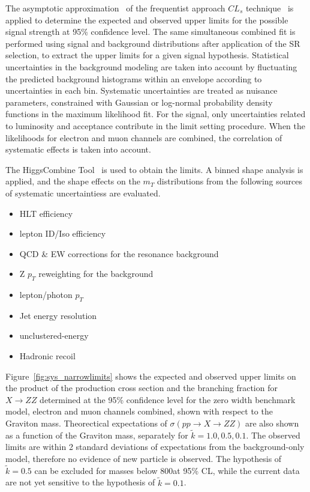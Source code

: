\vspace{0.3cm}
The asymptotic approximation~\cite{sys_cls0} of the frequentist approach $CL_s$ technique~\cite{sys_cls1,sys_cls2,sys_cls3} is applied to determine the expected and observed upper limits for the possible signal strength at 95\% confidence level. The same simultaneous combined fit is performed using signal and background distributions after application of the SR selection, to extract the upper limits for a given signal hypothesis. Statistical uncertainties in the background modeling are taken into account by fluctuating the predicted background histograms within an envelope according to uncertainties in each bin. Systematic uncertainties are treated as nuisance parameters, constrained with Gaussian or log-normal probability density functions in the maximum likelihood fit. For the signal, only uncertainties related to luminosity and acceptance contribute in the limit setting procedure. When the likelihoods for electron and muon channels are combined, the correlation of systematic effects is taken into account. 

\vspace{0.3cm}
The HiggsCombine Tool~\cite{sys_higgscombinetool} is used to obtain the limits. A binned shape analysis is applied, and the shape effects on the $m_T$ distributions from the following sources of systematic uncertaintiess are evaluated.
\begin{itemize}
\item HLT efficiency
\item lepton ID/Iso efficiency
\item QCD \& EW corrections for the resonance background
\item Z $p_T$ reweighting for the \Zjets background
\item \ptmiss lepton/photon $p_T$
\item \ptmiss Jet energy resolution
\item \ptmiss unclustered-energy
\item \ptmiss Hadronic recoil 
\end{itemize}

\vspace{0.3cm}
Figure~\ref{fig:sys_narrowlimits} shows the expected and observed upper limits on the product of the production cross section and the branching fraction for $X\rightarrow ZZ$ determined at the 95\% confidence level for the zero width benchmark model, electron and muon channels combined, shown with respect to the Graviton mass. Theorectical expectations of $\sigma(pp\rightarrow X\rightarrow ZZ)$ are also shown as a function of the Graviton mass, separately for $\tilde{k}=1.0,0.5,0.1$. The observed limits are within 2 standard deviations of expectations from the background-only model, therefore no evidence of new particle is observed. The hypothesis of $\tilde{k}=0.5$ can be excluded for masses below 800\GeV at 95\% CL, while the current data are not yet sensitive to the hypothesis of $\tilde{k}=0.1$. 

